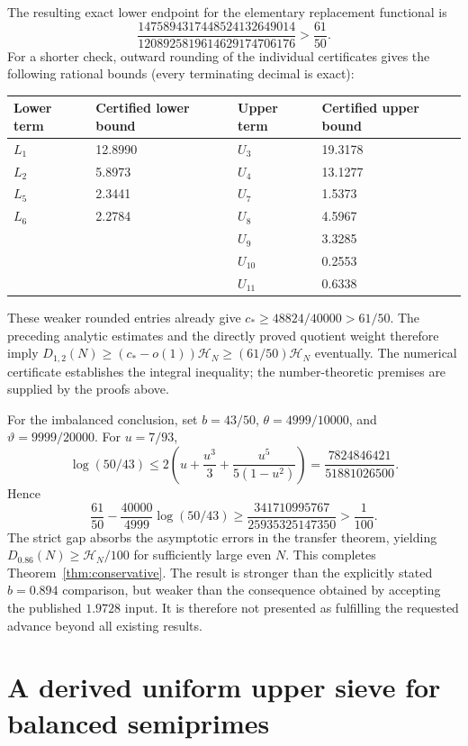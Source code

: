 \documentclass[11pt]{article}
\newcommand{\CN}{\mathcal C(N)}
\newcommand{\HN}{\mathcal H_N}
\begin{document}
The resulting exact lower endpoint for the elementary replacement
functional is
\[
 \frac{1475894317448524132649014}{1208925819614629174706176}
 >\frac{61}{50}.
\]
For a shorter check, outward rounding of the individual certificates
gives the following rational bounds (every terminating decimal is exact):
\begin{center}
\begin{tabular}{ll@{\qquad}ll}
\toprule
Lower term&Certified lower bound&Upper term&Certified upper bound\\
\midrule
$L_1$&12.8990&$U_3$&19.3178\\
$L_2$&5.8973&$U_4$&13.1277\\
$L_5$&2.3441&$U_7$&1.5373\\
$L_6$&2.2784&$U_8$&4.5967\\
&&$U_9$&3.3285\\
&&$U_{10}$&0.2553\\
&&$U_{11}$&0.6338\\
\bottomrule
\end{tabular}
\end{center}
These weaker rounded entries already give
$c_*\ge48824/40000>61/50$. The preceding analytic estimates and
the directly proved quotient weight therefore imply
$D_{1,2}(N)\ge(c_*-o(1))\HN\ge(61/50)\HN$ eventually.
The numerical certificate establishes the integral inequality; the
number-theoretic premises are supplied by the proofs above.

For the imbalanced conclusion, set $b=43/50$, $\theta=4999/10000$,
and $\vartheta=9999/20000$. For $u=7/93$,
\[
 \log(50/43)
 \le2\left(u+\frac{u^3}{3}+\frac{u^5}{5(1-u^2)}\right)
 =\frac{7824846421}{51881026500}.
\]
Hence
\[
 \frac{61}{50}-\frac{40000}{4999}\log(50/43)
 \ge\frac{341710995767}{25935325147350}>\frac1{100}.
\]
The strict gap absorbs the asymptotic errors in the transfer theorem,
yielding $D_{0.86}(N)\ge\HN/100$ for sufficiently large even $N$.
This completes Theorem~\ref{thm:conservative}.
The result is stronger than the explicitly stated $b=0.894$
comparison, but weaker than the consequence obtained by accepting the
published $1.9728$ input. It is therefore not presented as fulfilling
the requested advance beyond all existing results.


\section{A derived uniform upper sieve for balanced semiprimes}
\label{sec:semiprime-upper}
\end{document}
